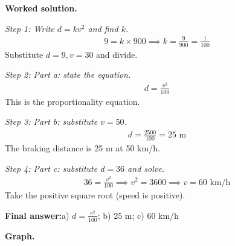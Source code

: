 \documentclass[11pt]{article}
\begin{document}
\textbf{Worked solution.}

\textit{Step 1: Write \( d = kv^2 \) and find \( k \).}
\[\begin{gathered}
9 = k \times 900 \implies k = \frac{9}{900} = \frac{1}{100}
\end{gathered}\]
Substitute \( d=9, v=30 \) and divide.

\textit{Step 2: Part a: state the equation.}
\[\begin{gathered}
d = \frac{v^2}{100}
\end{gathered}\]
This is the proportionality equation.

\textit{Step 3: Part b: substitute \( v = 50 \).}
\[\begin{gathered}
d = \frac{2500}{100} = 25 \text{ m}
\end{gathered}\]
The braking distance is 25 m at 50 km/h.

\textit{Step 4: Part c: substitute \( d = 36 \) and solve.}
\[\begin{gathered}
36 = \frac{v^2}{100} \implies v^2 = 3600 \implies v = 60 \text{ km/h}
\end{gathered}\]
Take the positive square root (speed is positive).

\begin{answerbox}
\textbf{Final answer:}\quad a) \(\displaystyle d = \frac{v^2}{100}\); b) \(\displaystyle 25\) m; c) \(\displaystyle 60\) km/h
\end{answerbox}
\textbf{Graph.}
\end{document}
